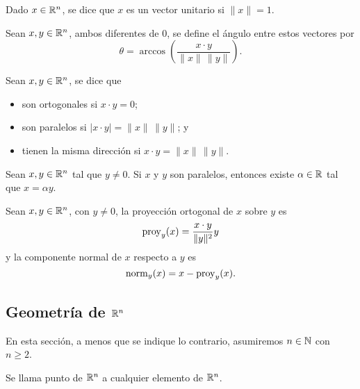\documentclass[a4,11pt]{aleph-notas}
\begin{document}
\begin{defi}
    Dado $x\in\mathbb{R}^n$, se dice que $x$ es un vector unitario si $\|x\|=1$.
\end{defi}

    

\begin{defi}
    Sean $x,y\in\mathbb{R}^n$, ambos diferentes de 0, se define el ángulo entre estos vectores por
    \[
       \theta =  \arccos\left( \frac{x\cdot y}{\|x\|\,\|y\|} \right).
    \]
\end{defi}

\begin{defi}
    Sean $x,y\in\mathbb{R}^n$, se dice que 
    \begin{itemize}
    \item 
        son ortogonales si $x\cdot y =0$;
    \item
        son paralelos si $|x\cdot y| = \|x\|\,\|y\|$; y
    \item
        tienen la misma dirección si $x\cdot y = \|x\|\,\|y\|$.
    \end{itemize}
\end{defi}

\begin{teo}
    Sean $x,y\in\mathbb{R}^n$ tal que $y\neq 0$. Si $x$ y $y$ son paralelos, entonces existe $\alpha\in\mathbb{R}$ tal que $x=\alpha y$.
\end{teo}

\begin{defi}
    Sean $x,y\in\mathbb{R}^n$, con $y\neq 0$, la proyección ortogonal de $x$ sobre $y$ es
    \[
        \operatorname{proy}_y(x) = \frac{x\cdot y}{\|y\|^2} y
    \]
    y la componente normal de $x$ respecto a $y$ es
    \[
        \operatorname{norm}_y(x) = x - \operatorname{proy}_y(x).
    \]
\end{defi}


\subsection{Geometría de $\R^n$}

En esta sección, a menos que se indique lo contrario, asumiremos $n\in\mathbb{N}$ con $n\geq 2$.

\begin{defi}[Puntos de $\R^n$]
    Se llama punto de $\R^n$ a cualquier elemento de $\R^n$. 
\end{defi}
\end{document}
